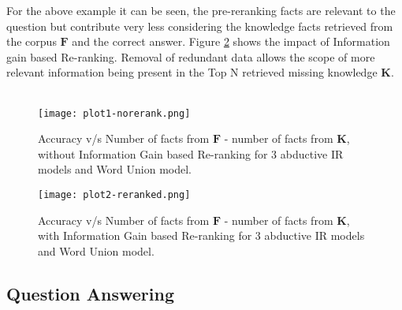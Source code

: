 \documentclass[11pt,a4paper]{article}
\begin{document}
For the above example it can be seen, the pre-reranking facts are relevant to the question but contribute very less considering the knowledge facts retrieved from the corpus $\mathbf{F}$ and the correct answer.
Figure \ref{fig:plt2} shows the impact of Information gain based Re-ranking. Removal of redundant data allows the scope of more relevant information being present in the Top N retrieved missing knowledge $\mathbf{K}$. \\

\noindent
{} \\

\begin{figure}[h!]
  \texttt{[image: plot1-norerank.png]}
  \caption{Accuracy v/s Number of facts from $\mathbf{F}$ - number of facts from $\mathbf{K}$, without Information Gain based Re-ranking for 3  abductive IR models and Word Union model. \footnotemark}
  \label{fig:plt1}
\end{figure}
\begin{figure}[h!]
  \texttt{[image: plot2-reranked.png]}
  \caption{Accuracy v/s Number of facts from $\mathbf{F}$ - number of facts from $\mathbf{K}$, with Information Gain based Re-ranking for 3 abductive IR models and Word Union model. \footnotemark[1]}
  \label{fig:plt2}
\end{figure}
\subsection{Question Answering}
\end{document}
